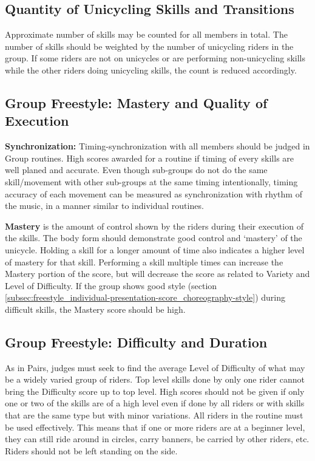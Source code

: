 \subsection{Quantity of Unicycling Skills and Transitions}
Approximate number of skills may be counted for all members in total.
The number of skills should be weighted by the number of unicycling riders in the group.
If some riders are not on unicycles or are performing non-unicycling skills while the other riders doing unicycling skills, the count is reduced accordingly.

\subsection{Group Freestyle: Mastery and Quality of Execution}
\textbf{Synchronization:} Timing-synchronization with all members should be judged in Group routines.
High scores awarded for a routine if timing of every skills are well planed and accurate.
Even though sub-groups do not do the same skill/movement with other sub-groups at the same timing intentionally, timing accuracy of each movement can be measured as synchronization with rhythm of the music, in a manner similar to individual routines.

\textbf{Mastery} is the amount of control shown by the riders during their execution of the skills.
The body form should demonstrate good control and ‘mastery' of the unicycle.
Holding a skill for a longer amount of time also indicates a higher level of mastery for that skill.
Performing a skill multiple times can increase the Mastery portion of the score, but will decrease the score as related to Variety and Level of Difficulty.
If the group shows good style (section \ref{subsec:freestyle_individual-presentation-score_choreography-style}) during difficult skills, the Mastery score should be high.

\subsection{Group Freestyle: Difficulty and Duration \label{subsec:freestyle_group-additional-judging-criteria_difficulty-duration}}
As in Pairs, judges must seek to find the average Level of Difficulty of what may be a widely varied group of riders.
Top level skills done by only one rider cannot bring the Difficulty score up to top level.
High scores should not be given if only one or two of the skills are of a high level even if done by all riders or with skills that are the same type but with minor variations.
All riders in the routine must be used effectively.
This means that if one or more riders are at a beginner level, they can still ride around in circles, carry banners, be carried by other riders, etc.
Riders should not be left standing on the side.

